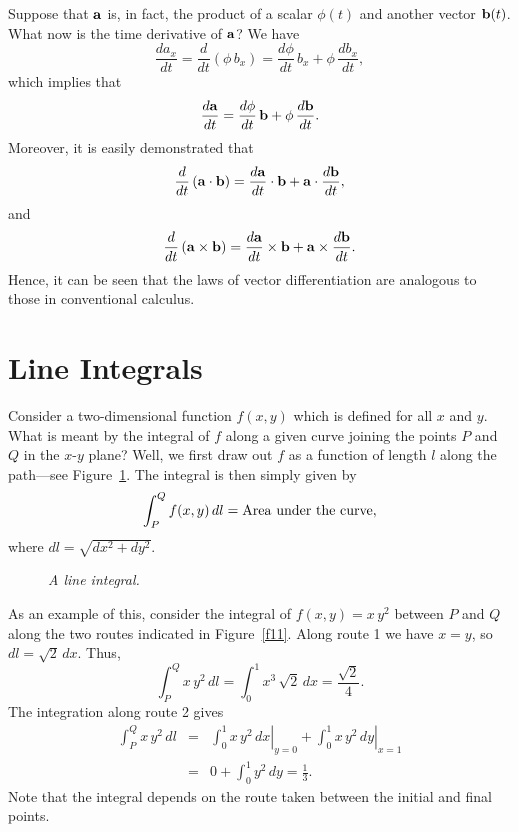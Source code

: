 Suppose that ${\bf a}$ is, in fact, the product of a scalar $\phi(t)$ and another vector
${\bf b}(t)$. What now is the time derivative of ${\bf a}$? We have
\begin{equation}
\frac{d a_x}{dt} = \frac{d}{dt}\!\left(\phi\, b_x\right) = \frac{d\phi}{dt}\, b_x + \phi \,
\frac{d b_x}{dt},
\end{equation}
which implies that
\begin{equation}
\frac{d {\bf a}}{dt} = \frac{d\phi}{dt}\, {\bf b} + \phi\, \frac{d {\bf b}}{dt}.
\end{equation}
Moreover, it is easily demonstrated that 
\begin{equation}
\frac{d}{dt}\left({\bf a}\cdot{\bf b}\right) = \frac{d{\bf a}}{dt}\cdot {\bf b} +{\bf a}\cdot\frac{d{\bf b}}{dt},
\end{equation}
and
\begin{equation}
\frac{d}{dt}\left({\bf a}\times{\bf b}\right) = \frac{d{\bf a}}{dt}\times{\bf b} + {\bf a}\times
\frac{d{\bf b}}{dt}.
\end{equation}
Hence, it can be seen that the laws of vector differentiation are analogous to those in 
conventional calculus.

\section{Line Integrals}
Consider a two-dimensional function $f(x,y)$ which is defined for all $x$ and $y$. 
What is meant by the integral of $f$ along a given curve joining the points $P$ and $Q$ in the $x$-$y$ plane?
Well, we first draw out $f$ as a function of length $l$ along the path---see Figure~\ref{f10}. The integral is then simply given
by
\begin{equation}
\int_{P}^Q f(x,y)\,dl = {\rm Area~under~the~curve},
\end{equation}
where $dl=\sqrt{dx^2+dy^2}$. 

\begin{figure}
\centerline{}
\caption{\em A line integral.}\label{f10}
\end{figure}

As an example of this, consider the integral of $f(x,y)= x\,y^2$ between $P$ and $Q$ along the
two routes indicated in Figure~\ref{f11}.
Along route 1 we have $x=y$, so $dl= \sqrt{2}\, dx$. Thus,
\begin{equation}
\int_P^Q x\,y^2\,dl = \int_0^1 x^3\,\sqrt{2} \,dx = \frac{\sqrt{2}}{4}.
\end{equation}
The integration along route 2 gives
\begin{eqnarray}
\int_P^Q x\,y^2\,dl &=& \left.\int_0^1 x\,y^2\,dx\right|_{y=0}+\left.\int_0^1 x\,y^2 \,dy
\right|_{x=1}\nonumber\\[0.5ex]
&=& 0 + \int_0^1 y^2\,dy = \frac{1}{3}.
\end{eqnarray}
Note that the integral depends on the route taken between the initial and final points. 

